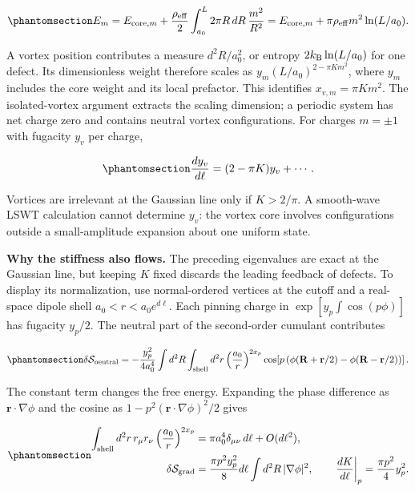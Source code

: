 \begin{equation}\phantomsection\label{eq-nbcp-clock-vortex-energy}{
E_m=E_{{\rm core},m}
+\frac{\rho_{\rm eff}}2\int_{a_0}^L2\pi R\,dR\,\frac{m^2}{R^2}
=E_{{\rm core},m}+\pi\rho_{\rm eff}m^2\ln(L/a_0).
}\end{equation}

A vortex position contributes a measure \(d^2R/a_0^2\), or entropy
\(2k_{\rm B}\ln(L/a_0)\) for one defect. Its dimensionless weight
therefore scales as \(y_m(L/a_0)^{2-\pi Km^2}\), where \(y_m\) includes
the core weight and its local prefactor. This identifies
\(x_{v,m}=\pi Km^2\). The isolated-vortex argument extracts the scaling
dimension; a periodic system has net charge zero and contains neutral
vortex configurations. For charges \(m=\pm1\) with fugacity \(y_v\) per
charge,

\begin{equation}\phantomsection\label{eq-nbcp-clock-vortex-flow}{
\frac{dy_v}{d\ell}=(2-\pi K)y_v+\cdots.
}\end{equation}

Vortices are irrelevant at the Gaussian line only if \(K>2/\pi\). A
smooth-wave LSWT calculation cannot determine \(y_v\): the vortex core
involves configurations outside a small-amplitude expansion about one
uniform state.

\textbf{Why the stiffness also flows.} The preceding eigenvalues are
exact at the Gaussian line, but keeping \(K\) fixed discards the leading
feedback of defects. To display its normalization, use normal-ordered
vertices at the cutoff and a real-space dipole shell
\(a_0<r<a_0e^{d\ell}\). Each pinning charge in
\(\exp[y_p\int\cos(p\phi)]\) has fugacity \(y_p/2\). The neutral part of
the second-order cumulant contributes

\begin{equation}\phantomsection\label{eq-nbcp-clock-neutral-dipole}{
\delta\mathcal S_{\rm neutral}
=-\frac{y_p^2}{4a_0^4}\int d^2R\int_{\rm shell}d^2r
\left(\frac{a_0}{r}\right)^{2x_p}
\cos\!\left[p\left(\phi(\mathbf R+\mathbf r/2)-\phi(\mathbf R-\mathbf r/2)\right)\right].
}\end{equation}

The constant term changes the free energy. Expanding the phase
difference as \(\mathbf r\cdot\nabla\phi\) and the cosine as
\(1-p^2(\mathbf r\cdot\nabla\phi)^2/2\) gives

\begin{equation}\phantomsection\label{eq-nbcp-clock-electric-screening}{
\begin{aligned}
\int_{\rm shell}d^2r\,r_\mu r_\nu
\left(\frac{a_0}{r}\right)^{2x_p}
&=\pi a_0^4\delta_{\mu\nu}\,d\ell+O(d\ell^2),\\
\delta\mathcal S_{\rm grad}
&=\frac{\pi p^2y_p^2}{8}d\ell\int d^2R\,|\nabla\phi|^2,
\qquad
\left.\frac{dK}{d\ell}\right|_p=\frac{\pi p^2}{4}y_p^2.
\end{aligned}
}\end{equation}

